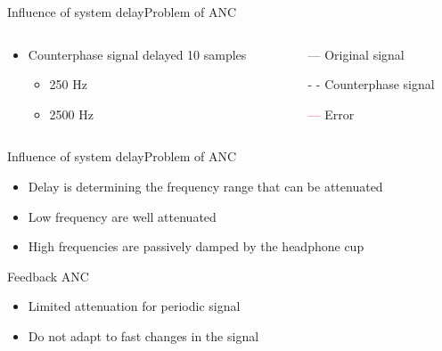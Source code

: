 \begin{frame}{Influence of system delay}{Problem of ANC}		
	\begin{columns}
		\begin{column}{0.5\textwidth}
			\begin{itemize}
				\item Counterphase signal delayed 10 samples	
				\begin{itemize}
					\item 250 Hz
					\item 2500 Hz 
				\end{itemize}	
			\end{itemize}
			\vspace{-6.5mm}			
		\begin{center}
	 		
	 	\end{center}
		\end{column}
		\begin{column}{0.5\textwidth} 
		\begin{itemize}
			\item[\textcolor{MATLABblue}{---}] Original signal
			\item[\textcolor{MATLABblue}{- -}] Counterphase signal
			\item[\textcolor{red}{---}] Error
		\end{itemize}
		\begin{center}
	 		
	 	\end{center}
		\end{column}
	\end{columns}
\end{frame}

\begin{frame}{Influence of system delay}{Problem of ANC}		
	\begin{center}
	\begin{itemize}
	\item Delay is determining the frequency range that can be attenuated
	\item Low frequency are well attenuated 
	\item High frequencies are passively damped by the headphone cup 
	\end{itemize}
	\end{center}
\end{frame}

\begin{frame}{Feedback ANC}
	
	\begin{itemize}
			\item Limited attenuation for periodic signal
			\item Do not adapt to fast changes in the signal
	\end{itemize}		
\end{frame}


